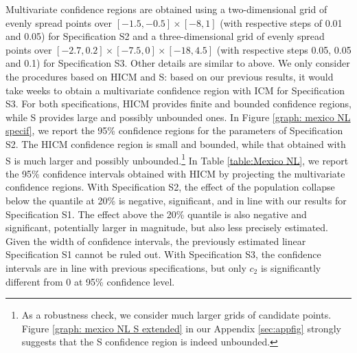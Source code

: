 \documentclass[12pt]{article}
\newcommand{\1}{\mathbf{1}}
\begin{document}
Multivariate confidence regions are obtained using a two-dimensional
grid of evenly spread points over $[-1.5,-0.5]\times[-8,1]$ (with
respective steps of 0.01 and 0.05) for Specification S2 and a
three-dimensional grid of evenly spread points over $[-2.7,
0.2]\times[-7.5,0]\times[-18, 4.5]$ (with
respective steps 0.05, 0.05 and 0.1) for Specification S3. Other details are similar to
above. We only consider the procedures based on HICM and S: based on
our previous results, it would take weeks to obtain a multivariate
confidence region with ICM for Specification S3. For both
specifications, HICM provides finite and bounded
confidence regions, while S provides large and possibly unbounded ones.
In Figure \ref{graph: mexico NL specif}, we  report the 95\% confidence
regions for the parameters of  Specification S2. The HICM confidence region is
small and bounded, while that obtained with S is much larger and
possibly unbounded.\footnote{As a robustness check,  we consider much larger grids of
candidate points.  Figure \ref{graph: mexico NL S extended} in our
Appendix \ref{sec:appfig} strongly suggests that the S confidence region is indeed
unbounded.} In Table \ref{table:Mexico NL}, we report the 95\%
confidence intervals obtained with HICM by projecting the multivariate
confidence regions.  With Specification S2, the effect of the
population collapse below the quantile at 20\% is negative,
significant, and in line with our results for Specification S1. The
effect above the 20\% quantile is also negative and significant,
potentially larger in magnitude, but also less precisely estimated.
Given the width of confidence intervals, the previously estimated
linear Specification S1 cannot be ruled out.
With  Specification S3, the confidence intervals  are in line with
previous specifications, but only $c_2$ is significantly different from 0 at
95\% confidence level.

\end{document}

